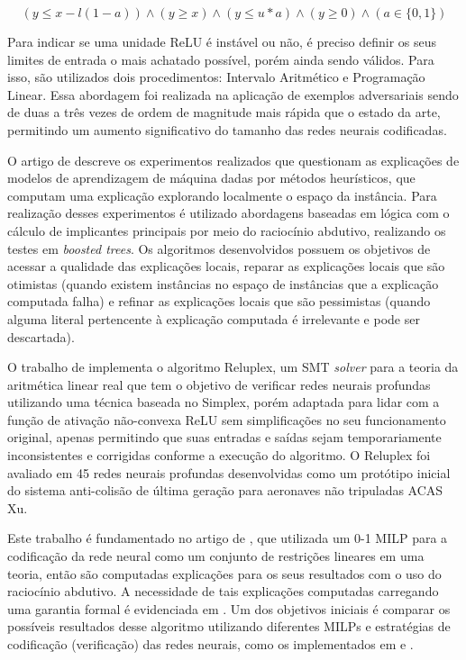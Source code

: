 \begin{equation}
    (y \leq x - l(1- a)) \wedge (y \geq x) \wedge (y \leq u*a) \wedge (y \geq 0) \wedge (a \in \{0, 1\})
    \label{eq:milp_top}
\end{equation}

Para indicar se uma unidade ReLU é instável ou não, é preciso definir os seus limites de entrada o mais achatado possível, porém ainda sendo válidos. Para isso, são utilizados dois procedimentos: Intervalo Aritmético e Programação Linear. Essa abordagem foi realizada na aplicação de exemplos adversariais sendo de duas a três vezes de ordem de magnitude mais rápida que o estado da arte, permitindo um aumento significativo do tamanho das redes neurais codificadas.

O artigo de  descreve os experimentos realizados que questionam as explicações de modelos de aprendizagem de máquina dadas por métodos heurísticos, que computam uma explicação explorando localmente o espaço da instância. Para realização desses experimentos é utilizado abordagens baseadas em lógica com o cálculo de implicantes principais por meio do raciocínio abdutivo, realizando os testes em \textit{boosted trees}. Os algoritmos desenvolvidos possuem os objetivos de acessar a qualidade das explicações locais, reparar as explicações locais que são otimistas (quando existem instâncias no espaço de instâncias que a explicação computada falha) e refinar as explicações locais que são pessimistas (quando alguma literal pertencente à explicação computada é irrelevante e pode ser descartada).

O trabalho de  implementa o algoritmo Reluplex, um SMT \textit{solver} para a teoria da aritmética linear real que tem o objetivo de verificar redes neurais profundas utilizando uma técnica baseada no Simplex, porém adaptada para lidar com a função de ativação não-convexa ReLU sem simplificações no seu funcionamento original, apenas permitindo que suas entradas e saídas sejam temporariamente inconsistentes e corrigidas conforme a execução do algoritmo. O Reluplex foi avaliado em 45 redes neurais profundas desenvolvidas como um protótipo inicial do sistema anti-colisão de última geração para aeronaves não tripuladas ACAS Xu. 

Este trabalho é fundamentado no artigo de , que utilizada um 0-1 MILP \cite{milp_01} para a codificação da rede neural como um conjunto de restrições lineares em uma teoria, então são computadas explicações para os seus resultados com o uso do raciocínio abdutivo. A necessidade de tais explicações computadas carregando uma garantia formal é evidenciada em . Um dos objetivos iniciais é comparar os possíveis resultados desse algoritmo utilizando diferentes MILPs e estratégias de codificação (verificação) das redes neurais, como os implementados em  e .